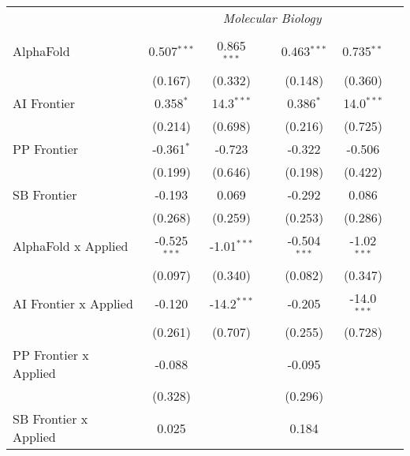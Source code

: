 \begin{tabular}{lcccccc}
 & \multicolumn{6}{c}{\textit{Molecular Biology}} \\ \\
   AlphaFold                      & 0.507$^{***}$  & 0.865$^{***}$ &               & 0.463$^{***}$  & 0.735$^{**}$  &   \\   
                                  & (0.167)        & (0.332)       &               & (0.148)        & (0.360)       &   \\   
   AI Frontier                    & 0.358$^{*}$    & 14.3$^{***}$  &               & 0.386$^{*}$    & 14.0$^{***}$  &   \\   
                                  & (0.214)        & (0.698)       &               & (0.216)        & (0.725)       &   \\   
   PP Frontier                    & -0.361$^{*}$   & -0.723        &               & -0.322         & -0.506        &   \\   
                                  & (0.199)        & (0.646)       &               & (0.198)        & (0.422)       &   \\   
   SB Frontier                    & -0.193         & 0.069         &               & -0.292         & 0.086         &   \\   
                                  & (0.268)        & (0.259)       &               & (0.253)        & (0.286)       &   \\   
   AlphaFold x Applied            & -0.525$^{***}$ & -1.01$^{***}$ &               & -0.504$^{***}$ & -1.02$^{***}$ &   \\   
                                  & (0.097)        & (0.340)       &               & (0.082)        & (0.347)       &   \\   
   AI Frontier x Applied          & -0.120         & -14.2$^{***}$ &               & -0.205         & -14.0$^{***}$ &   \\   
                                  & (0.261)        & (0.707)       &               & (0.255)        & (0.728)       &   \\   
   PP Frontier x Applied          & -0.088         &               &               & -0.095         &               &   \\   
                                  & (0.328)        &               &               & (0.296)        &               &   \\   
   SB Frontier x Applied          & 0.025          &               &               & 0.184          &               &   \\   

\end{tabular}
